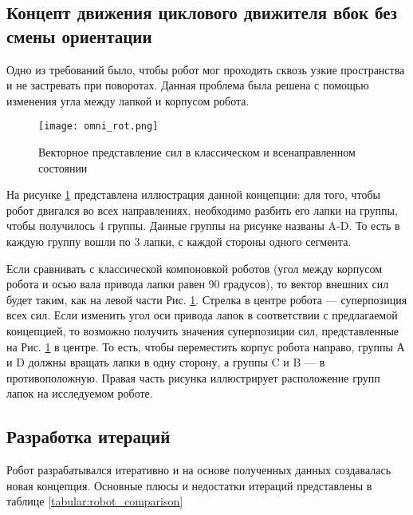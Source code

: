 \subsection{Концепт движения циклового движителя вбок без смены ориентации}

Одно из требований было, чтобы робот мог проходить сквозь узкие пространства и не застревать при поворотах. Данная проблема была решена с помощью изменения угла между лапкой и корпусом робота.

\begin{figure}[H]
    \centering\texttt{[image: omni\_rot.png]}
    \caption{Векторное представление сил в классическом и всенаправленном состоянии}
    \label{fig:omnidirection}
\end{figure}

На рисунке \ref{fig:omnidirection} представлена иллюстрация данной концепции: для того, чтобы робот двигался во всех направлениях, необходимо разбить его лапки на группы, чтобы получилось 4 группы. Данные группы на рисунке названы A-D. То есть в каждую группу вошли по 3 лапки, с каждой стороны одного сегмента.

Если сравнивать с классической компоновкой роботов (угол между корпусом робота и осью вала привода лапки равен 90 градусов), то вектор внешних сил будет таким, как на левой части Рис. \ref{fig:omnidirection}. Стрелка в центре робота — суперпозиция всех сил. Если изменить угол оси привода лапок в соответствии с предлагаемой концепцией, то возможно получить значения суперпозиции сил, представленные на Рис. \ref{fig:omnidirection} в центре. То есть, чтобы переместить корпус робота направо, группы А и D должны вращать лапки в одну сторону, а группы C и B — в противоположную. Правая часть рисунка иллюстрирует расположение групп лапок на исследуемом роботе. 

\subsection{Разработка итераций}
Робот разрабатывался итеративно и на основе полученных данных создавалась новая концепция. Основные плюсы и недостатки итераций представлены в таблице \ref{tabular:robot_comparison}

